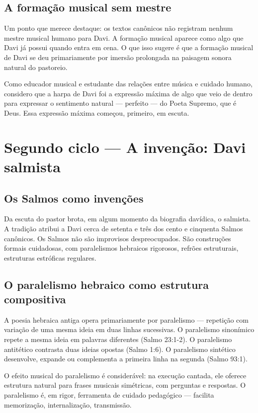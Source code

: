 \documentclass[12pt,a4paper]{article}
\begin{document}
\subsection{A formação musical sem mestre}

Um ponto que merece destaque: os textos canônicos não registram nenhum mestre musical humano para Davi. A formação musical aparece como algo que Davi já possui quando entra em cena. O que isso sugere é que a formação musical de Davi se deu primariamente por imersão prolongada na paisagem sonora natural do pastoreio.

Como educador musical e estudante das relações entre música e cuidado humano, considero que a harpa de Davi foi a expressão máxima de algo que veio de dentro para expressar o sentimento natural --- perfeito --- do Poeta Supremo, que é Deus. Essa expressão máxima começou, primeiro, em escuta.

\section{Segundo ciclo --- A invenção: Davi salmista}

\subsection{Os Salmos como invenções}

Da escuta do pastor brota, em algum momento da biografia davídica, o salmista. A tradição atribui a Davi cerca de setenta e três dos cento e cinquenta Salmos canônicos. Os Salmos não são improvisos despreocupados. São construções formais cuidadosas, com paralelismos hebraicos rigorosos, refrões estruturais, estruturas estróficas regulares.

\subsection{O paralelismo hebraico como estrutura compositiva}

A poesia hebraica antiga opera primariamente por paralelismo --- repetição com variação de uma mesma ideia em duas linhas sucessivas. O paralelismo sinonímico repete a mesma ideia em palavras diferentes (Salmo 23:1-2). O paralelismo antitético contrasta duas ideias opostas (Salmo 1:6). O paralelismo sintético desenvolve, expande ou complementa a primeira linha na segunda (Salmo 93:1).

O efeito musical do paralelismo é considerável: na execução cantada, ele oferece estrutura natural para frases musicais simétricas, com perguntas e respostas. O paralelismo é, em rigor, ferramenta de cuidado pedagógico --- facilita memorização, internalização, transmissão.
\end{document}
